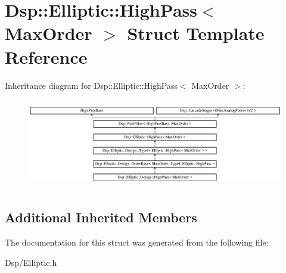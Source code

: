 \hypertarget{structDsp_1_1Elliptic_1_1HighPass}{\section{Dsp\-:\-:Elliptic\-:\-:High\-Pass$<$ Max\-Order $>$ Struct Template Reference}
\label{structDsp_1_1Elliptic_1_1HighPass}
}
Inheritance diagram for Dsp\-:\-:Elliptic\-:\-:High\-Pass$<$ Max\-Order $>$\-:\begin{figure}[H]
\begin{center}
\leavevmode
\includegraphics[height=3.952941cm]{structDsp_1_1Elliptic_1_1HighPass}
\end{center}
\end{figure}
\subsection*{Additional Inherited Members}


The documentation for this struct was generated from the following file\-:\begin{DoxyCompactItemize}
\item 
Dsp/Elliptic.\-h\end{DoxyCompactItemize}
